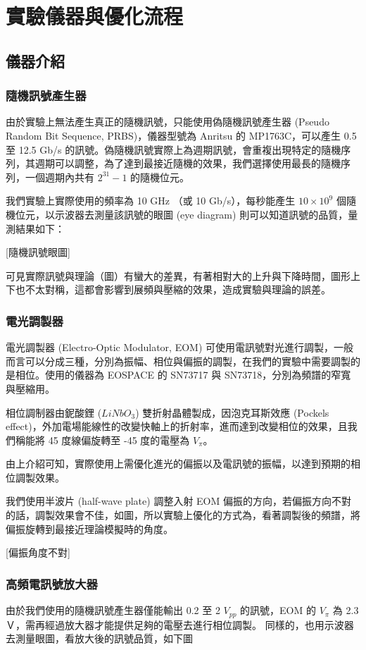 \documentclass[class=NCU_thesis, crop=false]{standalone}
\begin{document}
\chapter{實驗儀器與優化流程}
\section{儀器介紹}
\subsection{隨機訊號產生器}
由於實驗上無法產生真正的隨機訊號，只能使用偽隨機訊號產生器 (Pseudo Random Bit Sequence, PRBS)，儀器型號為 Anritsu 的 MP1763C，可以產生 0.5 至 12.5 Gb/s 的訊號。偽隨機訊號實際上為週期訊號，會重複出現特定的隨機序列，其週期可以調整，為了達到最接近隨機的效果，我們選擇使用最長的隨機序列，一個週期內共有 $2^{31}-1$ 的隨機位元。

我們實驗上實際使用的頻率為 10 GHz （或 10 Gb/s），每秒能產生 $10\times 10^{9}$ 個隨機位元，以示波器去測量該訊號的眼圖 (eye diagram) 則可以知道訊號的品質，量測結果如下：

[隨機訊號眼圖]

可見實際訊號與理論（圖）有蠻大的差異，有著相對大的上升與下降時間，圖形上下也不太對稱，這都會影響到展頻與壓縮的效果，造成實驗與理論的誤差。

\subsection{電光調製器}
電光調製器 (Electro-Optic Modulator, EOM) 可使用電訊號對光進行調製，一般而言可以分成三種，分別為振幅、相位與偏振的調製，在我們的實驗中需要調製的是相位。使用的儀器為 EOSPACE 的 SN73717 與 SN73718，分別為頻譜的窄寬與壓縮用。

相位調制器由鈮酸鋰 ($LiNbO_{3}$) 雙折射晶體製成，因泡克耳斯效應 (Pockels effect)，外加電場能線性的改變快軸上的折射率，進而達到改變相位的效果，且我們稱能將 45 度線偏旋轉至 -45 度的電壓為 $V_{\pi}$。

由上介紹可知，實際使用上需優化進光的偏振以及電訊號的振幅，以達到預期的相位調製效果。

我們使用半波片 (half-wave plate) 調整入射 EOM 偏振的方向，若偏振方向不對的話，調製效果會不佳，如圖，所以實驗上優化的方式為，看著調製後的頻譜，將偏振旋轉到最接近理論模擬時的角度。

[偏振角度不對]

\subsection{高頻電訊號放大器}
由於我們使用的隨機訊號產生器僅能輸出 0.2 至 2 $V_{pp}$ 的訊號，EOM 的 $V_{\pi}$ 為 2.3 Ｖ，需再經過放大器才能提供足夠的電壓去進行相位調製。
同樣的，也用示波器去測量眼圖，看放大後的訊號品質，如下圖
\end{document}
